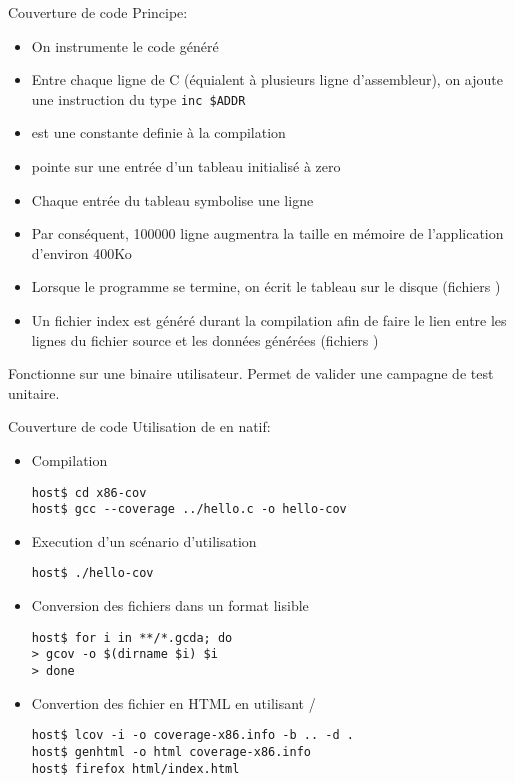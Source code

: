 \begin{frame}[fragile=singleslide]{Couverture de code}
  Principe:
  \begin{itemize}
  \item On instrumente le code généré
  \item Entre chaque ligne de C (équialent à plusieurs ligne
    d'assembleur), on ajoute une instruction du type \verb/inc $ADDR/
  \item {} est une constante definie à la compilation
  \item {} pointe sur une entrée d'un tableau initialisé à zero
  \item Chaque entrée du tableau symbolise une ligne
  \item Par conséquent, 100000 ligne augmentra la taille en mémoire de
    l'application d'environ 400Ko
  \item Lorsque le programme se termine, on écrit le tableau sur le
    disque (fichiers )
  \item Un fichier index est généré durant la compilation afin de faire
    le lien entre les lignes du fichier source et les données générées
    (fichiers )
  \end{itemize}
  Fonctionne sur une binaire utilisateur. 
  Permet de valider une campagne de test unitaire.
\end{frame}

\begin{frame}[fragile=singleslide]{Couverture de code}
  Utilisation de  en natif:
  \begin{itemize}
  \item Compilation
    \begin{lstlisting}
host$ cd x86-cov
host$ gcc --coverage ../hello.c -o hello-cov
    \end{lstlisting} 
  \item Execution d'un scénario d'utilisation
    \begin{lstlisting}
host$ ./hello-cov
    \end{lstlisting} 
  \item Conversion des fichiers   dans un format lisible
    \begin{lstlisting}
host$ for i in **/*.gcda; do
> gcov -o $(dirname $i) $i
> done
    \end{lstlisting} 
  \item  Convertion  des  fichier   en  HTML  en  utilisant
    /
    \begin{lstlisting}
host$ lcov -i -o coverage-x86.info -b .. -d .
host$ genhtml -o html coverage-x86.info
host$ firefox html/index.html
    \end{lstlisting} 
  \end{itemize}
\end{frame}
  
